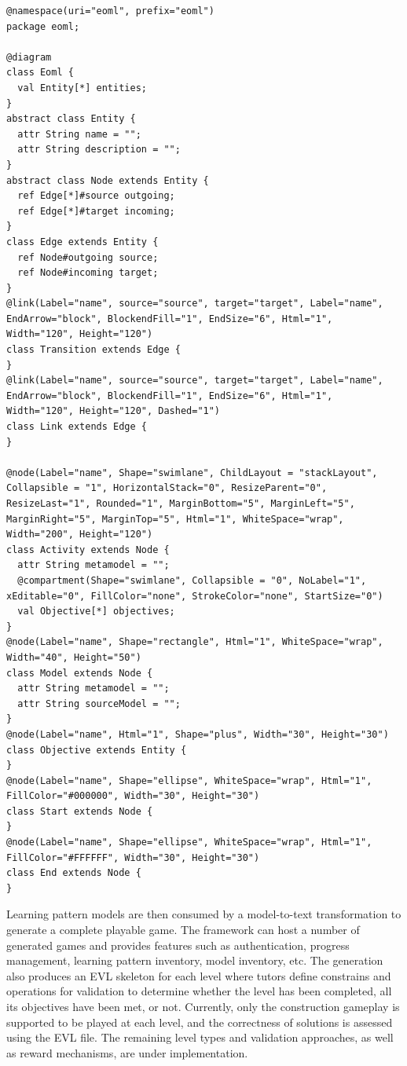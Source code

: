 \documentclass[conference]{IEEEtran}
\begin{document}
\begin{lstlisting}[style=interfaces,caption={The annotated metamodel of learning pattern modelling language.},label=pattern-metamodel]
@namespace(uri="eoml", prefix="eoml")
package eoml;

@diagram
class Eoml {
  val Entity[*] entities;
}
abstract class Entity {
  attr String name = "";
  attr String description = "";
}
abstract class Node extends Entity {
  ref Edge[*]#source outgoing;
  ref Edge[*]#target incoming;
}
class Edge extends Entity {
  ref Node#outgoing source;
  ref Node#incoming target;
}
@link(Label="name", source="source", target="target", Label="name", EndArrow="block", BlockendFill="1", EndSize="6", Html="1", Width="120", Height="120")
class Transition extends Edge {
}
@link(Label="name", source="source", target="target", Label="name", EndArrow="block", BlockendFill="1", EndSize="6", Html="1", Width="120", Height="120", Dashed="1")
class Link extends Edge {
}

@node(Label="name", Shape="swimlane", ChildLayout = "stackLayout", Collapsible = "1", HorizontalStack="0", ResizeParent="0", ResizeLast="1", Rounded="1", MarginBottom="5", MarginLeft="5", MarginRight="5", MarginTop="5", Html="1", WhiteSpace="wrap", Width="200", Height="120")
class Activity extends Node {
  attr String metamodel = "";
  @compartment(Shape="swimlane", Collapsible = "0", NoLabel="1", xEditable="0", FillColor="none", StrokeColor="none", StartSize="0")
  val Objective[*] objectives;
}
@node(Label="name", Shape="rectangle", Html="1", WhiteSpace="wrap", Width="40", Height="50")
class Model extends Node {
  attr String metamodel = "";
  attr String sourceModel = "";
}
@node(Label="name", Html="1", Shape="plus", Width="30", Height="30")
class Objective extends Entity {
}
@node(Label="name", Shape="ellipse", WhiteSpace="wrap", Html="1", FillColor="#000000", Width="30", Height="30")
class Start extends Node {
}
@node(Label="name", Shape="ellipse", WhiteSpace="wrap", Html="1", FillColor="#FFFFFF", Width="30", Height="30")
class End extends Node {
}
\end{lstlisting} 

Learning pattern models are then consumed by a model-to-text transformation to generate a complete playable game. The framework can host a number of generated games and provides features such as authentication, progress management, learning pattern inventory, model inventory, etc. The generation also produces an EVL \cite{kolovos2006eclipse} skeleton for each level where tutors define constrains and operations for validation to determine whether the level has been completed, all its objectives have been met, or not. Currently, only the construction gameplay is supported to be played at each level, and the correctness of solutions is assessed using the EVL file. The remaining level types and validation approaches, as well as reward mechanisms,  are under implementation. 
\end{document}
